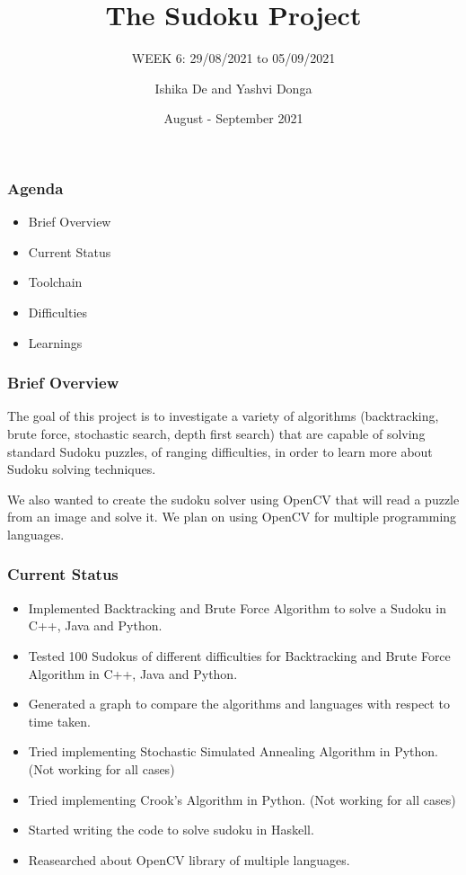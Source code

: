 \documentclass{beamer}
\title{The Sudoku Project}
\subtitle{WEEK 6: 29/08/2021 to 05/09/2021}
\author[Ishika | Yashvi]{Ishika De and Yashvi Donga}
\date{August - September 2021}
\begin{document}
\begin{frame}
     \titlepage
\end{frame}
\begin{frame}
     \frametitle{Agenda}
     \begin{itemize}
          \item Brief Overview
          \item Current Status
          \item Toolchain
          \item Difficulties
          \item Learnings
     \end{itemize}
\end{frame}

\begin{frame}
     \frametitle{Brief Overview}
     The goal of this project is to investigate a variety of algorithms (backtracking, brute force, stochastic search, depth first search) that are capable of solving
standard Sudoku puzzles, of ranging difficulties, in order to learn more about Sudoku
solving techniques.\newline

     We also wanted to create the sudoku solver using OpenCV that will read a puzzle from an image and solve it. We plan on using OpenCV for multiple programming languages.
\end{frame}

\begin{frame}
     \frametitle{Current Status}   
     \begin{itemize}
		  \item Implemented Backtracking and Brute Force Algorithm to solve a Sudoku in C++, Java and Python.
		  \item Tested 100 Sudokus of different difficulties for Backtracking and Brute Force Algorithm in C++, Java and Python.
		  \item Generated a graph to compare the algorithms and languages with respect to time taken.
		  \item Tried implementing Stochastic Simulated Annealing Algorithm in Python. (Not working for all cases) 
		  \item Tried implementing Crook's Algorithm in Python. (Not working for all cases)
		  \item Started writing the code to solve sudoku in Haskell. 
		  \item Reasearched about OpenCV library of multiple languages.
	 \end{itemize}
\end{frame}
\end{document}
